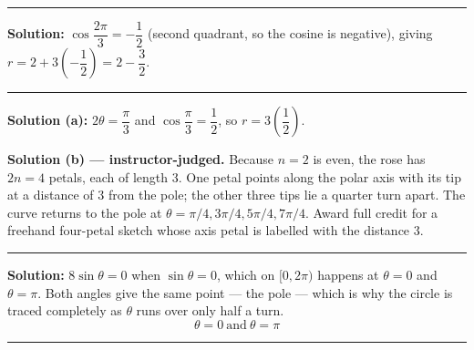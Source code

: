 \documentclass[12pt]{article}
\begin{document}
\vspace{0.15cm}\noindent\rule{\linewidth}{0.2pt}\vspace{0.15cm}


\textbf{Solution:} \quad $\cos\dfrac{2\pi}{3} = -\dfrac{1}{2}$ (second quadrant, so the
cosine is negative), giving $r = 2 + 3\left(-\dfrac{1}{2}\right) = 2 - \dfrac{3}{2}$.

\vspace{0.15cm}\noindent\rule{\linewidth}{0.2pt}\vspace{0.15cm}


\textbf{Solution (a):} \quad $2\theta = \dfrac{\pi}{3}$ and $\cos\dfrac{\pi}{3} = \dfrac{1}{2}$,
so $r = 3\left(\dfrac{1}{2}\right)$. 

\textbf{Solution (b) --- instructor-judged.} \quad Because $n = 2$ is even, the rose has
$2n = 4$ petals, each of length $3$. One petal points along the polar axis with its tip at a
distance of $3$ from the pole; the other three tips lie a quarter turn apart. The curve
returns to the pole at $\theta = \pi/4, 3\pi/4, 5\pi/4, 7\pi/4$. Award full credit for a
freehand four-petal sketch whose axis petal is labelled with the distance $3$.

\vspace{0.15cm}\noindent\rule{\linewidth}{0.2pt}\vspace{0.15cm}

\problem{The circle $r = 8\sin\theta$ passes through the pole. Find every $\theta$ in
$[0, 2\pi)$ for which $r = 0$.}

\textbf{Solution:} \quad $8\sin\theta = 0$ when $\sin\theta = 0$, which on $[0, 2\pi)$ happens
at $\theta = 0$ and $\theta = \pi$. Both angles give the same point --- the pole --- which is
why the circle is traced completely as $\theta$ runs over only half a turn.
\[ \boxed{\theta = 0 \ \text{and} \ \theta = \pi} \]

\vspace{0.15cm}\noindent\rule{\linewidth}{0.2pt}\vspace{0.15cm}

\end{document}
